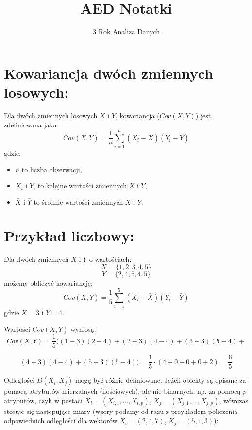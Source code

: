 \documentclass{article}
\title{AED Notatki}
\author{3 Rok Analiza Danych}
\begin{document}
\maketitle

\tableofcontents 



\section*{Kowariancja dwóch zmiennych losowych:}
Dla dwóch zmiennych losowych \(X\) i \(Y\), kowariancja (\(Cov(X, Y)\)) jest zdefiniowana jako:
\[
Cov(X, Y) = \frac{1}{n} \sum_{i=1}^{n} (X_i - \bar{X})(Y_i - \bar{Y})
\]
gdzie:
\begin{itemize}
    \item \(n\) to liczba obserwacji,
    \item \(X_i\) i \(Y_i\) to kolejne wartości zmiennych \(X\) i \(Y\),
    \item \(\bar{X}\) i \(\bar{Y}\) to średnie wartości zmiennych \(X\) i \(Y\).
\end{itemize}

\section*{Przykład liczbowy:}
Dla dwóch zmiennych \(X\) i \(Y\) o wartościach:
\[ X = \{1, 2, 3, 4, 5\} \]
\[ Y = \{2, 4, 5, 4, 5\} \]
możemy obliczyć kowariancję:
\[
Cov(X, Y) = \frac{1}{5} \sum_{i=1}^{5} (X_i - \bar{X})(Y_i - \bar{Y})
\]
gdzie \(\bar{X} = 3\) i \(\bar{Y} = 4\).

Wartości \(Cov(X, Y)\) wyniosą:
\[ Cov(X, Y) = \frac{1}{5} ((1-3)(2-4) + (2-3)(4-4) + (3-3)(5-4) +\]

\[ (4-3)(4-4) + (5-3)(5-4)) = \frac{1}{5} \cdot (4 + 0 + 0 + 0 + 2) = \frac{6}{5} \]


Odległości $D(X_i, X_j)$ mogą być różnie definiowane. Jeżeli obiekty są opisane za pomocą atrybutów mierzalnych (ilościowych), ale nie binarnych, np. za pomocą $p$ atrybutów, czyli w postaci $X_i = (X_{i,1}, \ldots, X_{i,p})$, $X_j = (X_{j,1}, \ldots, X_{j,p})$, wówczas stosuje się następujące miary (wzory podamy od razu z przykładem policzenia odpowiednich odległości dla wektorów $X_i=(2,4,7)$, $X_j=(5,1,3)$):
\end{document}
